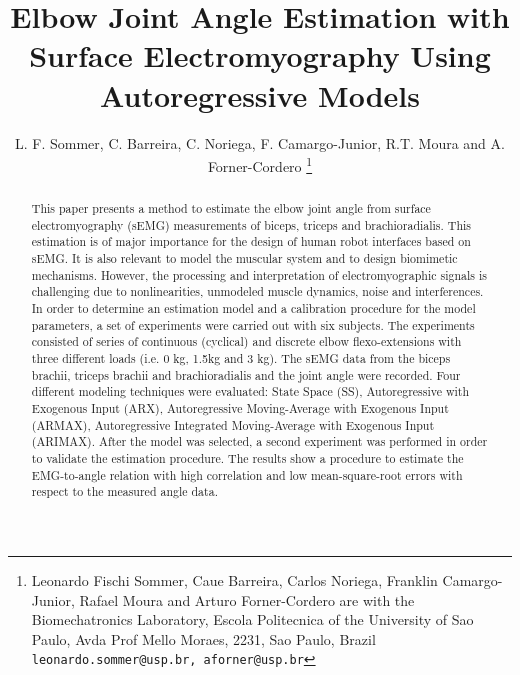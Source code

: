 \documentclass[letterpaper, 10 pt, conference]{ieeeconf}  %
\title{\LARGE \bf Elbow Joint Angle Estimation with Surface Electromyography Using Autoregressive Models
}
\author{L. F. Sommer, C. Barreira, C. Noriega, F. Camargo-Junior, R.T. Moura and A. Forner-Cordero%
\thanks{Leonardo Fischi Sommer, Caue Barreira, Carlos Noriega, Franklin Camargo-Junior, Rafael Moura and Arturo Forner-Cordero are with the Biomechatronics Laboratory, Escola Politecnica of the University of Sao Paulo, Avda Prof Mello Moraes, 2231, Sao Paulo, Brazil {\tt\small leonardo.sommer@usp.br, aforner@usp.br}}
}
\begin{document}
\maketitle
\thispagestyle{empty}
\pagestyle{empty}


\begin{abstract}


This paper presents a method to estimate the elbow joint angle from surface electromyography (sEMG) measurements of biceps, triceps and brachioradialis. This estimation is of major importance for the design of human robot interfaces based on sEMG. It is also relevant to model the muscular system and to design biomimetic mechanisms. However, the processing and interpretation of electromyographic signals is challenging due to nonlinearities, unmodeled muscle dynamics, noise and interferences. In order to determine an estimation model and a calibration procedure for the model parameters, a set of experiments were carried out with six subjects. The experiments consisted of series of continuous (cyclical) and discrete elbow flexo-extensions with three different loads (i.e. 0 kg, 1.5kg and 3 kg). The sEMG data from the biceps brachii, triceps brachii and brachioradialis and the joint angle were recorded. Four different modeling techniques were evaluated: State Space (SS), Autoregressive with Exogenous Input (ARX), Autoregressive Moving-Average with Exogenous Input (ARMAX), Autoregressive Integrated Moving-Average with Exogenous Input (ARIMAX). After the model was selected, a second experiment was performed in order to validate the estimation procedure. The results show a procedure to estimate the EMG-to-angle relation with high correlation and low mean-square-root errors with respect to the measured angle data.

\end{abstract}
\end{document}
